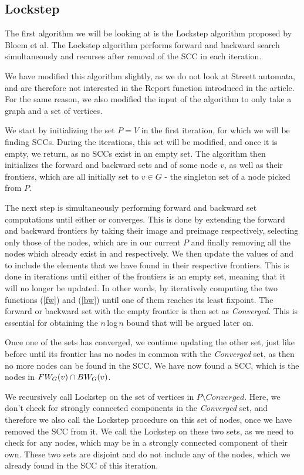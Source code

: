 \documentclass[../master/master.tex]{subfiles}
\begin{document}
\subsection{Lockstep}
The first algorithm we will be looking at is the Lockstep algorithm proposed by Bloem et al. \cite{lockstep} The Lockstep algorithm performs forward and backward search simultaneously and recurses after removal of the SCC in each iteration.

We have modified this algorithm slightly, as we do not look at Streett automata, and are therefore not interested in the Report function introduced in the article. For the same reason, we also modified the input of the algorithm to only take a graph and a set of vertices. 

We start by initializing the set $P=V$ in the first iteration, for which we will be finding SCCs. During the iterations, this set will be modified, and once it is empty, we return, as no SCCs exist in an empty set. The algorithm then initializes the forward and backward sets  and  of some node $v$, as well as their frontiers, which are all initially set to $v\in G$ - the singleton set of a node picked from $P$.

The next step is simultaneously performing forward and backward set computations until either  or  converges. This is done by extending the forward and backward frontiers by taking their image and preimage respectively, selecting only those of the nodes, which are in our current $P$ and finally removing all the nodes which already exist in  and  respectively. We then update the values of  and  to include the elements that we have found in their respective frontiers. This is done in iterations until either of the frontiers is an empty set, meaning that it will no longer be updated.
In other words, by iteratively computing the two functions (\ref{fw}) and (\ref{bw}) until one of them reaches its least fixpoint. The forward or backward set with the empty frontier is then set as \emph{Converged}. This is essential for obtaining the $n$\,log\,$n$ bound that will be argued later on.

Once one of the sets has converged, we continue updating the other set, just like before until its frontier has no nodes in common with the \emph{Converged} set, as then no more nodes can be found in the SCC.
We have now found a SCC, which is the nodes in $FW_{G}(v)\cap BW_{G}(v)$. 

We recursively call Lockstep on the set of vertices in $P\setminus Converged$. Here, we don't check for strongly connected components in the \emph{Converged} set, and therefore we also call the Lockstep procedure on this set of nodes, once we have removed the SCC from it. We call the Lockstep on these two sets, as we need to check for any nodes, which may be in a strongly connected component of their own. These two sets are disjoint and do not include any of the nodes, which we already found in the SCC of this iteration.
\end{document}
